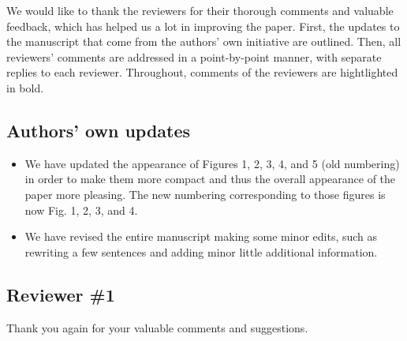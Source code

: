 \documentclass[11pt]{report}
\begin{document}
We would like to thank the reviewers for their thorough comments and valuable feedback, which has helped us a lot in improving the paper. First, the updates to the manuscript that come from the authors' own initiative are outlined. Then, all reviewers' comments are addressed in a point-by-point manner, with separate replies to each reviewer. 
Throughout, comments of the reviewers are hightlighted in bold.

\noindent \hdashrule{12.5cm}{0.2pt}{2mm 1pt}

\subsection*{Authors' own updates}

\begin{itemize}

\item We have updated the appearance of Figures 1, 2, 3, 4, and 5 (old numbering) in order to make them more compact and thus the overall appearance of the paper more pleasing. The new numbering corresponding to those figures is now Fig. 1, 2, 3, and 4.

\item We have revised the entire manuscript making some minor edits, such as rewriting a few sentences and adding minor little additional information.

\end{itemize}

\noindent \hdashrule{12.5cm}{0.2pt}{2mm 1pt}

\subsection*{Reviewer \#1}

Thank you again for your valuable comments and suggestions.

\end{document}
